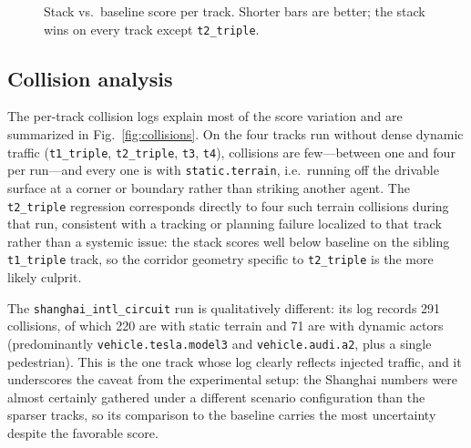 \documentclass[conference]{IEEEtran}
\begin{document}
\begin{figure}[t]
\centering
{}
\caption{Stack vs.\ baseline score per track. Shorter bars are better; the stack
wins on every track except \texttt{t2\_triple}.}
\label{fig:scores}
\end{figure}

\subsection{Collision analysis}

The per-track collision logs explain most of the score variation and are
summarized in Fig.~\ref{fig:collisions}. On the four tracks run without dense
dynamic traffic (\texttt{t1\_triple}, \texttt{t2\_triple}, \texttt{t3},
\texttt{t4}), collisions are few---between one and four per run---and every one
is with \texttt{static.terrain}, i.e.\ running off the drivable surface at a
corner or boundary rather than striking another agent. The \texttt{t2\_triple}
regression corresponds directly to four such terrain collisions during that run,
consistent with a tracking or planning failure localized to that track rather
than a systemic issue: the stack scores well below baseline on the sibling
\texttt{t1\_triple} track, so the corridor geometry specific to
\texttt{t2\_triple} is the more likely culprit.

The \texttt{shanghai\_intl\_circuit} run is qualitatively different: its log
records 291 collisions, of which 220 are with static terrain and 71 are with
dynamic actors (predominantly \texttt{vehicle.tesla.model3} and
\texttt{vehicle.audi.a2}, plus a single pedestrian). This is the one track whose
log clearly reflects injected traffic, and it underscores the caveat from the
experimental setup: the Shanghai numbers were almost certainly gathered under a
different scenario configuration than the sparser tracks, so its comparison to
the baseline carries the most uncertainty despite the favorable score.
\end{document}
